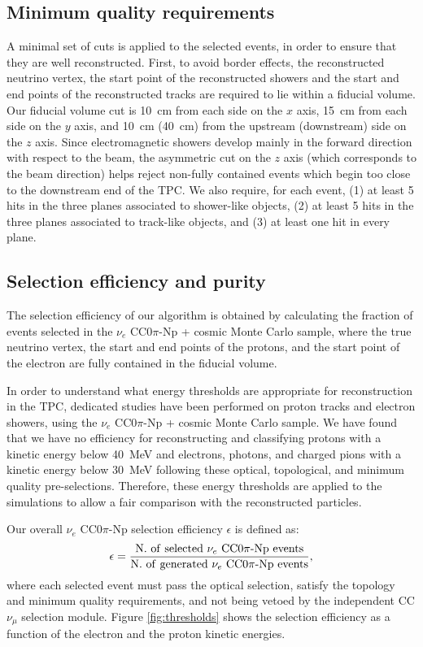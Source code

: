 \subsection{Minimum quality requirements}\label{sec:precuts}
A minimal set of cuts is applied to the selected events, in order to ensure that they are well reconstructed.
First, to avoid border effects, the reconstructed neutrino vertex, the start point of the reconstructed showers and the start and end points of the reconstructed tracks are required to lie within a fiducial volume. Our fiducial volume cut is 10~cm from each side on the $x$ axis, 15~cm from each side on the $y$ axis, and 10~cm (40~cm) from the upstream (downstream) side on the $z$ axis. 
Since electromagnetic showers develop mainly in the forward direction with respect to the beam, the asymmetric cut on the $z$ axis (which corresponds to the beam direction) helps reject non-fully contained events which begin too close to the downstream end of the TPC.
We also require, for each event, (1) at least 5 hits in the three planes associated to shower-like objects, (2) at least 5 hits in the three planes associated to track-like objects, and (3) at least one hit in every plane.


\subsection{Selection efficiency and purity}\label{sec:eff}
The selection efficiency of our algorithm is obtained by calculating the fraction of events selected in the $\nu_{e}$ CC$0\pi$-Np + cosmic Monte Carlo sample, where the true neutrino vertex, the start and end points of the protons, and the start point of the electron are fully contained in the fiducial volume.

In order to understand what energy thresholds are appropriate for reconstruction in the TPC, dedicated studies have been performed on proton tracks and electron showers, using the $\nu_{e}$ CC$0\pi$-Np + cosmic Monte Carlo sample. We have found that we have no efficiency for reconstructing and classifying protons {with a kinetic energy} below 40~MeV and electrons{, photons, and charged pions} {with a kinetic energy} below 30~MeV following these optical, topological, and minimum quality pre-selections. Therefore, these energy thresholds are applied to the simulations to allow a fair comparison with the reconstructed particles. 

Our overall $\nu_{e}$ CC$0\pi$-Np selection efficiency $\epsilon$ is defined as:
\begin{equation}
\epsilon = \frac{\mathrm{N.~of~selected~}\nu_{e}\mathrm{~CC0}\pi\mathrm{{\text -}Np~events}}{\mathrm{N.~of~generated~}\nu_{e}\mathrm{~CC0}\pi\mathrm{{\text -}Np~events}},
\end{equation}
where each selected event must pass the optical selection, satisfy the topology and minimum quality requirements, and not being vetoed by the independent CC $\nu_{\mu}$ selection module. Figure \ref{fig:thresholds} shows the selection efficiency as a function of the electron and the proton kinetic energies. 

